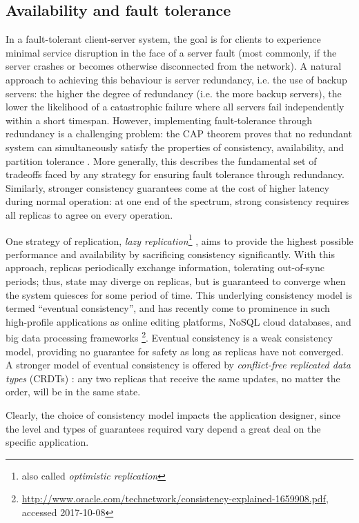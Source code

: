 \subsection{Availability and fault tolerance}
\label{sub:background_replication}

In a fault-tolerant client-server system, the goal is for clients to experience minimal service disruption in the face of a server fault (most commonly, if the server crashes or becomes otherwise disconnected from the network).
A natural approach to achieving this behaviour is server redundancy, i.e. the use of backup servers: the higher the degree of redundancy (i.e. the more backup servers), the lower the likelihood of a catastrophic failure where all servers fail independently within a short timespan.
However, implementing fault-tolerance through redundancy is a challenging problem: the CAP theorem proves that no redundant system can simultaneously satisfy the properties of consistency, availability, and partition tolerance \cite{gilbert2002brewer}.
More generally, this describes the fundamental set of tradeoffs faced by any strategy for ensuring fault tolerance through redundancy.
Similarly, stronger consistency guarantees come at the cost of higher latency during normal operation: at one end of the spectrum, strong consistency requires all replicas to agree on every operation.

One strategy of replication, \textit{lazy replication}\footnote{also called \textit{optimistic replication}} \cite{Ladin:1990,Ladin:1992}, aims to provide the highest possible performance and availability by sacrificing consistency significantly.
With this approach, replicas periodically exchange information, tolerating out-of-sync periods; thus, state may diverge on replicas, but is guaranteed to converge when the system quiesces for some period of time.
This underlying consistency model is termed ``eventual consistency'', and has recently come to prominence in such high-profile applications as online editing platforms, NoSQL cloud databases, and big data processing frameworks \footnote{\url{http://www.oracle.com/technetwork/consistency-explained-1659908.pdf}, accessed 2017-10-08}.
Eventual consistency is a weak consistency model, providing no guarantee for safety as long as replicas have not converged.
A stronger model of eventual consistency is offered by \textit{conflict-free replicated data types} (CRDTs) \cite{Shapiro:2011}: any two replicas that receive the same updates, no matter the order, will be in the same state.

Clearly, the choice of consistency model impacts the application designer, since the level and types of guarantees required vary depend a great deal on the specific application.
